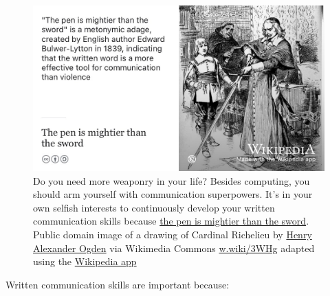\documentclass[
]{book}
\begin{document}
\begin{figure}

{\centering \includegraphics[width=1\linewidth]{images/the-pen-is-mightier-than-the-sword} 

}

\caption{Do you need more weaponry in your life? Besides computing, you should arm yourself with communication superpowers. It's in your own selfish interests to continuously develop your written communication skills because \href{https://en.wikipedia.org/wiki/The_pen_is_mightier_than_the_sword}{the pen is mightier than the sword}. Public domain image of a drawing of Cardinal Richelieu by \href{https://en.wikipedia.org/wiki/Henry_Alexander_Ogden}{Henry Alexander Ogden} via Wikimedia Commons \href{https://w.wiki/3WHg}{w.wiki/3WHg} adapted using the \href{https://apps.apple.com/us/app/wikipedia/id324715238}{Wikipedia app}}\label{fig:mighty-pen-fig}
\end{figure}



Written communication skills are important because:
\end{document}

